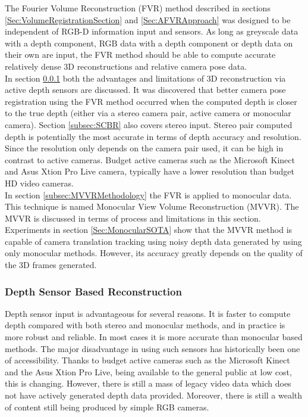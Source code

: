
The Fourier Volume Reconstruction (FVR) method described in sections \ref{Sec:VolumeRegistrationSection} and \ref{Sec:AFVRApproach} was designed to be independent of RGB-D information input and sensors. As long as greyscale data with a depth component, RGB data with a depth component or depth data on their own are input, the FVR method should be able to compute accurate relatively dense 3D reconstructions and relative camera pose data. \\

In section \ref{subsec:DSBR} both the advantages and limitations of 3D reconstruction via active depth sensors are discussed. It was discovered that better camera pose registration using the FVR method occurred when the computed depth is closer to the true depth (either via a stereo camera pair, active camera or monocular camera). Section \ref{subsec:SCBR} also covers stereo input. Stereo pair computed depth is potentially the most accurate in terms of depth accuracy and resolution. Since the resolution only depends on the camera pair used, it can be high in contrast to active cameras. Budget active cameras such as the Microsoft Kinect and Asus Xtion Pro Live camera, typically have a lower resolution than budget HD video cameras. \\

In section \ref{subsec:MVVRMethodology} the FVR is applied to monocular data. This technique is named Monocular View Volume Reconstruction (MVVR). The MVVR is discussed in terms of process and limitations in this section. Experiments in section \ref{Sec:MonocularSOTA} show that the MVVR method is capable of camera translation tracking using noisy depth data generated by using only monocular methods. However, its accuracy greatly depends on the quality of the 3D frames generated. \\

\subsubsection{Depth Sensor Based Reconstruction}
\label{subsec:DSBR}

Depth sensor input is advantageous for several reasons. It is faster to compute depth compared with both stereo and monocular methods, and in practice is more robust and reliable. In most cases it is more accurate than monocular based methods. The major disadvantage in using such sensors has historically been one of accessibility. Thanks to budget active cameras such as the Microsoft Kinect and the Asus Xtion Pro Live, being available to the general public at low cost, this is changing. However, there is still a mass of legacy video data which does not have actively generated depth data provided. Moreover, there is still a wealth of content still being produced by simple RGB cameras. \\

